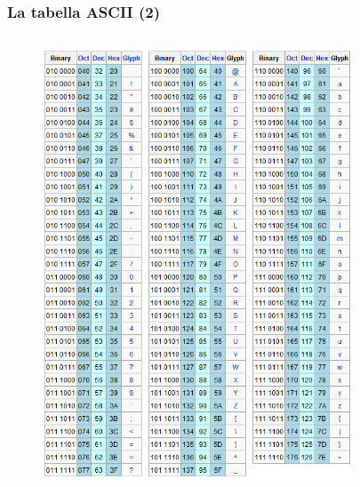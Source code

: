 \documentclass[handout]{beamer}
\begin{document}
\begin{frame}
  \frametitle{La tabella ASCII (2)}
\begin{columns}
\begin{column}{.33\textwidth}
  \begin{center}
    \begin{figure}
      \includegraphics[width=\columnwidth]{img/ascii1.jpg}
    \end{figure}
  \end{center}
\end{column}
\begin{column}{.33\textwidth}
  \begin{center}
    \begin{figure}

\end{figure}
\end{center}
\end{column}
\end{columns}
\end{frame}
\end{document}
